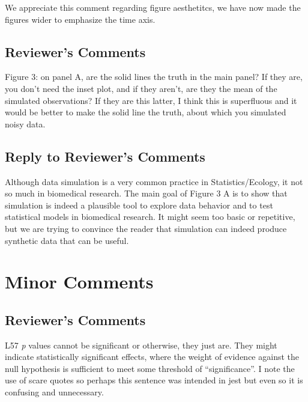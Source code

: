 \documentclass[
]{article}
\begin{document}
We appreciate this comment regarding figure aesthetitcs, we have now made the figures wider to emphasize the time axis.

\hypertarget{reviewers-comments-13}{%
\subsection{Reviewer's Comments}\label{reviewers-comments-13}}

Figure 3: on panel A, are the solid lines the truth in the main panel? If they are, you don't need the inset plot, and if they aren't, are they the mean of the simulated observations? If they are this latter, I think this is superfluous and it would be better to make the solid line the truth, about which you simulated noisy data.

\hypertarget{section-13}{%
\subsection{\texorpdfstring{\textcolor{reviewersblue} {Reply to Reviewer's Comments}}{}}\label{section-13}}

Although data simulation is a very common practice in Statistics/Ecology, it not so much in biomedical research. The main goal of Figure 3 A is to show that simulation is indeed a plausible tool to explore data behavior and to test statistical models in biomedical research. It might seem too basic or repetitive, but we are trying to convince the reader that simulation can indeed produce synthetic data that can be useful.

\hypertarget{minor-comments}{%
\section{Minor Comments}\label{minor-comments}}

\hypertarget{reviewers-comments-14}{%
\subsection{Reviewer's Comments}\label{reviewers-comments-14}}

L57 \emph{p} values cannot be significant or otherwise, they just are. They might indicate statistically significant effects, where the weight of evidence against the null hypothesis is sufficient to meet some threshold of ``significance''. I note the use of scare quotes so perhaps this sentence was intended in jest but even
so it is confusing and unnecessary.
\end{document}
